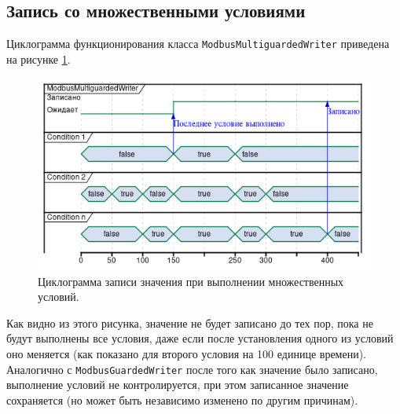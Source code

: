 \subsection{Запись со множественными условиями}

Циклограмма функционирования класса \texttt{ModbusMultiguardedWriter} приведена на рисунке \ref{sec:fig:modbus_multiguarded_writed}.
\begin{center}
    \begin{figure}[h!]
        \includegraphics[width=.8\textwidth,keepaspectratio]{../out/Dissertation/listings/uml/modbus_multiguarded_writer/modbus_multiguarded_writer.png}
        \caption{Циклограмма записи значения при выполнении множественных условий.}\label{sec:fig:modbus_multiguarded_writed}
    \end{figure}
\end{center}
Как видно из этого рисунка, значение не будет записано до тех пор, пока не будут
выполнены все условия, даже если после установления одного из условий оно меняется
(как показано для второго условия на 100 единице времени). Аналогично с \texttt{ModbusGuardedWriter}
после того как значение было записано, выполнение условий не контролируется, 
при этом записанное значение сохраняется (но может быть независимо изменено по другим причинам).

